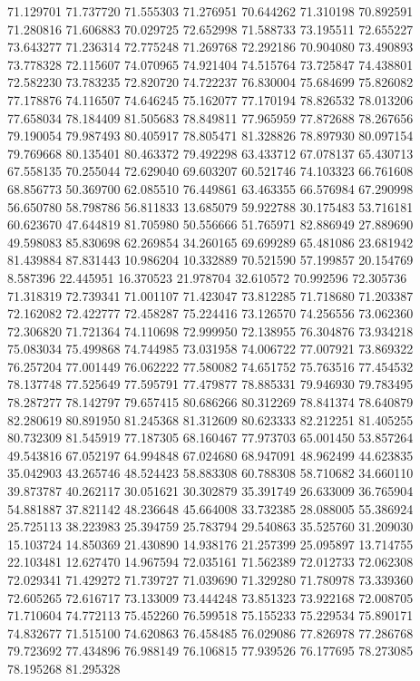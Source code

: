 71.129701
71.737720
71.555303
71.276951
70.644262
71.310198
70.892591
71.280816
71.606883
70.029725
72.652998
71.588733
73.195511
72.655227
73.643277
71.236314
72.775248
71.269768
72.292186
70.904080
73.490893
73.778328
72.115607
74.070965
74.921404
74.515764
73.725847
74.438801
72.582230
73.783235
72.820720
74.722237
76.830004
75.684699
75.826082
77.178876
74.116507
74.646245
75.162077
77.170194
78.826532
78.013206
77.658034
78.184409
81.505683
78.849811
77.965959
77.872688
78.267656
79.190054
79.987493
80.405917
78.805471
81.328826
78.897930
80.097154
79.769668
80.135401
80.463372
79.492298
63.433712
67.078137
65.430713
67.558135
70.255044
72.629040
69.603207
60.521746
74.103323
66.761608
68.856773
50.369700
62.085510
76.449861
63.463355
66.576984
67.290998
56.650780
58.798786
56.811833
13.685079
59.922788
30.175483
53.716181
60.623670
47.644819
81.705980
50.556666
51.765971
82.886949
27.889690
49.598083
85.830698
62.269854
34.260165
69.699289
65.481086
23.681942
81.439884
87.831443
10.986204
10.332889
70.521590
57.199857
20.154769
8.587396
22.445951
16.370523
21.978704
32.610572
70.992596
72.305736
71.318319
72.739341
71.001107
71.423047
73.812285
71.718680
71.203387
72.162082
72.422777
72.458287
75.224416
73.126570
74.256556
73.062360
72.306820
71.721364
74.110698
72.999950
72.138955
76.304876
73.934218
75.083034
75.499868
74.744985
73.031958
74.006722
77.007921
73.869322
76.257204
77.001449
76.062222
77.580082
74.651752
75.763516
77.454532
78.137748
77.525649
77.595791
77.479877
78.885331
79.946930
79.783495
78.287277
78.142797
79.657415
80.686266
80.312269
78.841374
78.640879
82.280619
80.891950
81.245368
81.312609
80.623333
82.212251
81.405255
80.732309
81.545919
77.187305
68.160467
77.973703
65.001450
53.857264
49.543816
67.052197
64.994848
67.024680
68.947091
48.962499
44.623835
35.042903
43.265746
48.524423
58.883308
60.788308
58.710682
34.660110
39.873787
40.262117
30.051621
30.302879
35.391749
26.633009
36.765904
54.881887
37.821142
48.236648
45.664008
33.732385
28.088005
55.386924
25.725113
38.223983
25.394759
25.783794
29.540863
35.525760
31.209030
15.103724
14.850369
21.430890
14.938176
21.257399
25.095897
13.714755
22.103481
12.627470
14.967594
72.035161
71.562389
72.012733
72.062308
72.029341
71.429272
71.739727
71.039690
71.329280
71.780978
73.339360
72.605265
72.616717
73.133009
73.444248
73.851323
73.922168
72.008705
71.710604
74.772113
75.452260
76.599518
75.155233
75.229534
75.890171
74.832677
71.515100
74.620863
76.458485
76.029086
77.826978
77.286768
79.723692
77.434896
76.988149
76.106815
77.939526
76.177695
78.273085
78.195268
81.295328
